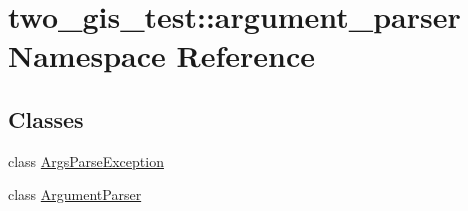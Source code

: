 \hypertarget{namespacetwo__gis__test_1_1argument__parser}{}\section{two\+\_\+gis\+\_\+test\+:\+:argument\+\_\+parser Namespace Reference}
\label{namespacetwo__gis__test_1_1argument__parser}
\subsection*{Classes}
\begin{DoxyCompactItemize}
\item 
class \hyperlink{classtwo__gis__test_1_1argument__parser_1_1_args_parse_exception}{Args\+Parse\+Exception}
\item 
class \hyperlink{classtwo__gis__test_1_1argument__parser_1_1_argument_parser}{Argument\+Parser}
\end{DoxyCompactItemize}
